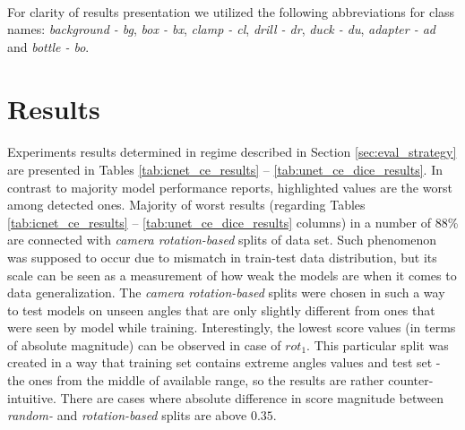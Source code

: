 \documentclass{article}
\begin{document}
\paragraph{}
For clarity of results presentation we utilized the following abbreviations for class names: \textit{background - bg}, \textit{box - bx}, \textit{clamp - cl}, \textit{drill - dr}, \textit{duck - du}, \textit{adapter - ad} and \textit{bottle - bo}.

\section{Results}
\label{sec:results}
\paragraph{}
Experiments results determined in regime described in Section \ref{sec:eval_strategy} are presented in Tables \ref{tab:icnet_ce_results} -- \ref{tab:unet_ce_dice_results}. In contrast to majority model performance reports, highlighted values are the worst among detected ones. Majority of worst results (regarding Tables \ref{tab:icnet_ce_results} -- \ref{tab:unet_ce_dice_results} columns) in a number of 88\% are connected with \textit{camera rotation-based} splits of data set. Such phenomenon was supposed to occur due to mismatch in train-test data distribution, but its scale can be seen as a measurement of how weak the models are when it comes to data generalization. The \textit{camera rotation-based} splits were chosen in such a way to test models on unseen angles that are only slightly different from ones that were seen by model while training.  Interestingly, the lowest score values (in terms of absolute magnitude) can be observed in case of $rot_1$. This particular split was created in a way that training set contains extreme angles values and test set - the ones from the middle of available range, so the results are rather  counter-intuitive. There are cases where absolute difference in score magnitude between \textit{random-} and \textit{rotation-based} splits are above $0.35$.
\end{document}
